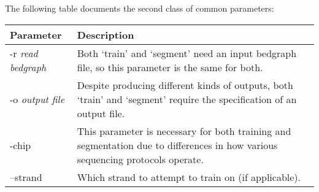 \documentclass[12pt,letterpaper]{article}
\begin{document}
The following table documents the second class of common parameters:

\begin{tabular} {| l | p{8cm} |}
 \hline
 \textbf{Parameter} & \textbf{Description}\\
 \hline
 -r \textit{read bedgraph} & Both `train' and `segment' need an input bedgraph file, so this parameter is the same for both.\\
 \hline
 -o \textit{output file} & Despite producing different kinds of outputs, both `train' and `segment' require the specification of an output file.\\
 \hline
 -chip & This parameter is necessary for both training and segmentation due to differences in how various sequencing protocols operate.\\
 \hline
 --strand & Which strand to attempt to train on (if applicable).\\
 \hline
\end{tabular}
\end{document}
